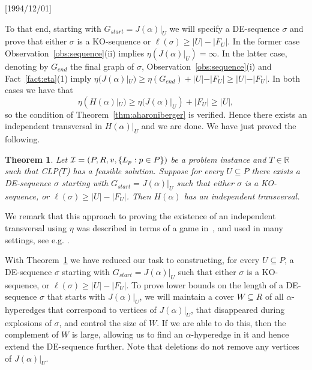 \NeedsTeXFormat{LaTeX2e}[1994/12/01]\documentclass[letterpaper, 11pt]{article}
\newtheorem{thm}{Theorem}[section]
\theoremstyle{definition}
\theoremstyle{remark}
\numberwithin{equation}{section}
\begin{document}
To that end, starting with $G_{start}=J(\alpha)|_U$ we will specify a 
DE-sequence $\sigma$ and prove that either $\sigma$ is a KO-sequence
or $\ell(\sigma) \ge |U|-|F_U|$. In the former case
Observation~\ref{obs:sequence}(ii) implies
$\eta (J(\alpha)|_U) = \infty$. In the latter case, denoting by $G_{end}$ the final graph of $\sigma$,  Observation~\ref{obs:sequence}(i) and Fact~\ref{fact:eta}(1) imply
$\eta (J(\alpha)|_U) \geq \eta(G_{end}) + |U|-|F_U| \geq |U|-|F_U|$.
In both cases we have that $$\eta(H(\alpha)|_U) \geq \eta (J(\alpha)|_U)
+ |F_U| \geq |U|,$$
so the condition of Theorem~\ref{thm:aharoniberger}
is verified. Hence there exists an independent transversal in
$H(\alpha)|_U$ and we are done.
We have just proved the following.
\begin{thm}\label{thm:diet}
  Let ${\cal I} = ( P ,R, v, \{ L_p: p\in P \})$ be a problem instance
  and $T \in \mathbb{R}$ such that CLP($T$) has a feasible solution. 
 Suppose for every $U\subseteq P$ there exists a
 DE-sequence $\sigma$ starting with
  $G_{start}=J(\alpha)|_U$ such that either $\sigma$ is a KO-sequence, or
  $\ell(\sigma)\geq |U|-|F_U|$. Then $H(\alpha)$ has an independent
  transversal.
\end{thm}
  
We remark that this approach to proving the existence of an
independent transversal using $\eta$ was described in terms of a game
in~\cite{aharonibergerziv}, and used in many settings, see
e.g. \cite{aharbergkotlziv, aharonibergersprussel,
   aharholzhowaspru, haxell2, haxell3, haxellnarins}.

With Theorem~\ref{thm:diet} we have reduced our task to constructing,  
for every $U\subseteq P$, a DE-sequence $\sigma$ starting with
  $G_{start}=J(\alpha)|_U$ such that either $\sigma$ is a KO-sequence, or
  $\ell(\sigma)\geq |U|-|F_U|$.  
To prove lower bounds on the length of a DE-sequence $\sigma$ that
starts with $J(\alpha)|_U$, 
we will maintain a cover $W\subseteq R$ of all $\alpha$-hyperedges that
correspond to vertices of $J(\alpha)|_U$, that
disappeared during explosions of $\sigma$, and control
the size of $W$.
If we are able to do this, then the complement of $W$ is large,
allowing us to find an $\alpha$-hyperedge in it and hence
extend the DE-sequence further. 
Note that deletions do not remove any vertices of $J(\alpha)|_U$.
\end{document}

